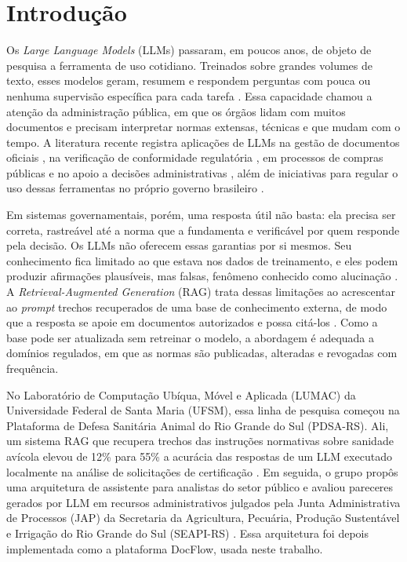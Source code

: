 \chapter{Introdução}
\label{cap:introducao}

Os \textit{Large Language Models} (LLMs) passaram, em poucos anos, de objeto de pesquisa a ferramenta de uso cotidiano. Treinados sobre grandes volumes de texto, esses modelos geram, resumem e respondem perguntas com pouca ou nenhuma supervisão específica para cada tarefa \cite{Brown2020,Zhao2023}. Essa capacidade chamou a atenção da administração pública, em que os órgãos lidam com muitos documentos e precisam interpretar normas extensas, técnicas e que mudam com o tempo. A literatura recente registra aplicações de LLMs na gestão de documentos oficiais \cite{Ayuyang2026}, na verificação de conformidade regulatória \cite{Legado2026}, em processos de compras públicas \cite{Sofat2024} e no apoio a decisões administrativas \cite{Drobotowicz2026,Montero2026}, além de iniciativas para regular o uso dessas ferramentas no próprio governo brasileiro \cite{Alves2024}.

Em sistemas governamentais, porém, uma resposta útil não basta: ela precisa ser correta, rastreável até a norma que a fundamenta e verificável por quem responde pela decisão. Os LLMs não oferecem essas garantias por si mesmos. Seu conhecimento fica limitado ao que estava nos dados de treinamento, e eles podem produzir afirmações plausíveis, mas falsas, fenômeno conhecido como alucinação \cite{Ji2023}. A \textit{Retrieval-Augmented Generation} (RAG) \cite{Lewis2020} trata dessas limitações ao acrescentar ao \textit{prompt} trechos recuperados de uma base de conhecimento externa, de modo que a resposta se apoie em documentos autorizados e possa citá-los \cite{Gao2023}. Como a base pode ser atualizada sem retreinar o modelo, a abordagem é adequada a domínios regulados, em que as normas são publicadas, alteradas e revogadas com frequência.

No Laboratório de Computação Ubíqua, Móvel e Aplicada (LUMAC) da Universidade Federal de Santa Maria (UFSM), essa linha de pesquisa começou na Plataforma de Defesa Sanitária Animal do Rio Grande do Sul (PDSA-RS). Ali, um sistema RAG que recupera trechos das instruções normativas sobre sanidade avícola elevou de 12\% para 55\% a acurácia das respostas de um LLM executado localmente na análise de solicitações de certificação \cite{Montero2025iceis,Montero2025}. Em seguida, o grupo propôs uma arquitetura de assistente para analistas do setor público e avaliou pareceres gerados por LLM em recursos administrativos julgados pela Junta Administrativa de Processos (JAP) da Secretaria da Agricultura, Pecuária, Produção Sustentável e Irrigação do Rio Grande do Sul (SEAPI-RS) \cite{Montero2026}. Essa arquitetura foi depois implementada como a plataforma DocFlow, usada neste trabalho.

